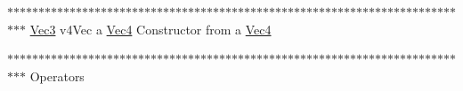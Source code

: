 \label{struct_vec3_a93eb39d022851b48795f794b4bcf78ea}
$\ast$$\ast$$\ast$$\ast$$\ast$$\ast$$\ast$$\ast$$\ast$$\ast$$\ast$$\ast$$\ast$$\ast$$\ast$$\ast$$\ast$$\ast$$\ast$$\ast$$\ast$$\ast$$\ast$$\ast$$\ast$$\ast$$\ast$$\ast$$\ast$$\ast$$\ast$$\ast$$\ast$$\ast$$\ast$$\ast$$\ast$$\ast$$\ast$$\ast$$\ast$$\ast$$\ast$$\ast$$\ast$$\ast$$\ast$$\ast$$\ast$$\ast$$\ast$$\ast$$\ast$$\ast$$\ast$$\ast$$\ast$$\ast$$\ast$$\ast$$\ast$$\ast$$\ast$$\ast$$\ast$$\ast$$\ast$$\ast$$\ast$$\ast$$\ast$$\ast$$\ast$$\ast$$\ast$  \hyperlink{struct_vec3}{Vec3}  v4Vec a \hyperlink{struct_vec4}{Vec4}  Constructor from a \hyperlink{struct_vec4}{Vec4}

$\ast$$\ast$$\ast$$\ast$$\ast$$\ast$$\ast$$\ast$$\ast$$\ast$$\ast$$\ast$$\ast$$\ast$$\ast$$\ast$$\ast$$\ast$$\ast$$\ast$$\ast$$\ast$$\ast$$\ast$$\ast$$\ast$$\ast$$\ast$$\ast$$\ast$$\ast$$\ast$$\ast$$\ast$$\ast$$\ast$$\ast$$\ast$$\ast$$\ast$$\ast$$\ast$$\ast$$\ast$$\ast$$\ast$$\ast$$\ast$$\ast$$\ast$$\ast$$\ast$$\ast$$\ast$$\ast$$\ast$$\ast$$\ast$$\ast$$\ast$$\ast$$\ast$$\ast$$\ast$$\ast$$\ast$$\ast$$\ast$$\ast$$\ast$$\ast$$\ast$$\ast$$\ast$$\ast$ Operators


